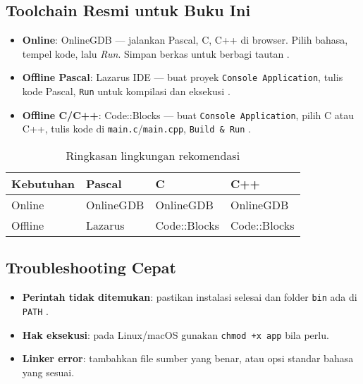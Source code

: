 \documentclass[../main.tex]{subfiles}
\begin{document}
\subsection{Toolchain Resmi untuk Buku Ini}
\begin{itemize}
  \item \textbf{Online}: OnlineGDB — jalankan Pascal, C, C++ di browser. Pilih bahasa, tempel kode, lalu \emph{Run}. Simpan berkas untuk berbagi tautan \parencite{onlinegdb}.
  \item \textbf{Offline Pascal}: Lazarus IDE — buat proyek \texttt{Console Application}, tulis kode Pascal, \texttt{Run} untuk kompilasi dan eksekusi \parencite{lazarus}.
  \item \textbf{Offline C/C++}: Code::Blocks — buat \texttt{Console Application}, pilih C atau C++, tulis kode di \texttt{main.c}/\texttt{main.cpp}, \texttt{Build \& Run} \parencite{codeblocks}.
\end{itemize}

\begin{table}[h]
  \centering
  \caption{Ringkasan lingkungan rekomendasi}
  \begin{tabular}{@{}llll@{}}
    \toprule
    Kebutuhan & Pascal & C & C++ \\
    \midrule
    Online & OnlineGDB & OnlineGDB & OnlineGDB \\
    Offline & Lazarus & Code::Blocks & Code::Blocks \\
    \bottomrule
  \end{tabular}
\end{table}

\subsection{Troubleshooting Cepat}
\begin{itemize}
  \item \textbf{Perintah tidak ditemukan}: pastikan instalasi selesai dan folder \texttt{bin} ada di \texttt{PATH} \parencite{gcc-docs,clang-docs,free-pascal-docs}.
  \item \textbf{Hak eksekusi}: pada Linux/macOS gunakan \texttt{chmod +x app} bila perlu.
  \item \textbf{Linker error}: tambahkan file sumber yang benar, atau opsi standar bahasa yang sesuai.
\end{itemize}
\end{document}

